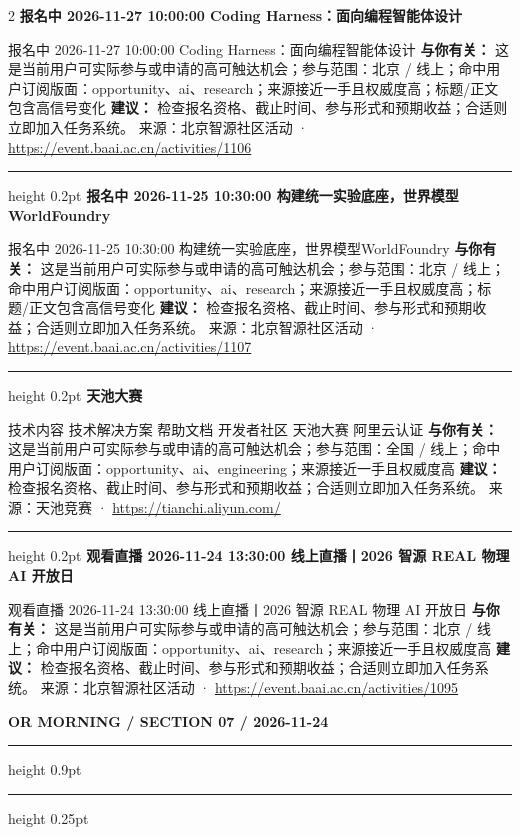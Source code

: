\documentclass[10.5pt]{ctexart}
\begin{document}
\begin{multicols}{2}
{\large\bfseries 报名中 2026-11-27 10:00:00 Coding Harness：面向编程智能体设计}\par
报名中 2026-11-27 10:00:00 Coding Harness：面向编程智能体设计
\textbf{与你有关：} 这是当前用户可实际参与或申请的高可触达机会；参与范围：北京 / 线上；命中用户订阅版面：opportunity、ai、research；来源接近一手且权威度高；标题/正文包含高信号变化
\textbf{建议：} 检查报名资格、截止时间、参与形式和预期收益；合适则立即加入任务系统。
{\footnotesize\color{ormuted} 来源：北京智源社区活动 · \url{https://event.baai.ac.cn/activities/1106}}
\vspace{2mm}
\hrule height 0.2pt
\vspace{2mm}
{\large\bfseries 报名中 2026-11-25 10:30:00 构建统一实验底座，世界模型WorldFoundry}\par
报名中 2026-11-25 10:30:00 构建统一实验底座，世界模型WorldFoundry
\textbf{与你有关：} 这是当前用户可实际参与或申请的高可触达机会；参与范围：北京 / 线上；命中用户订阅版面：opportunity、ai、research；来源接近一手且权威度高；标题/正文包含高信号变化
\textbf{建议：} 检查报名资格、截止时间、参与形式和预期收益；合适则立即加入任务系统。
{\footnotesize\color{ormuted} 来源：北京智源社区活动 · \url{https://event.baai.ac.cn/activities/1107}}
\vspace{2mm}
\hrule height 0.2pt
\vspace{2mm}
{\large\bfseries 天池大赛}\par
技术内容 技术解决方案 帮助文档 开发者社区 天池大赛 阿里云认证
\textbf{与你有关：} 这是当前用户可实际参与或申请的高可触达机会；参与范围：全国 / 线上；命中用户订阅版面：opportunity、ai、engineering；来源接近一手且权威度高
\textbf{建议：} 检查报名资格、截止时间、参与形式和预期收益；合适则立即加入任务系统。
{\footnotesize\color{ormuted} 来源：天池竞赛 · \url{https://tianchi.aliyun.com/}}
\vspace{2mm}
\hrule height 0.2pt
\vspace{2mm}
{\large\bfseries 观看直播 2026-11-24 13:30:00 线上直播丨2026 智源 REAL 物理 AI 开放日}\par
观看直播 2026-11-24 13:30:00 线上直播丨2026 智源 REAL 物理 AI 开放日
\textbf{与你有关：} 这是当前用户可实际参与或申请的高可触达机会；参与范围：北京 / 线上；命中用户订阅版面：opportunity、ai、research；来源接近一手且权威度高
\textbf{建议：} 检查报名资格、截止时间、参与形式和预期收益；合适则立即加入任务系统。
{\footnotesize\color{ormuted} 来源：北京智源社区活动 · \url{https://event.baai.ac.cn/activities/1095}}
\end{multicols}
\newpage
{\small\bfseries OR MORNING / SECTION 07 / 2026-11-24}
\vspace{2mm}
\hrule height 0.9pt
\vspace{1.5mm}
\hrule height 0.25pt
\vspace{4mm}
\end{document}
